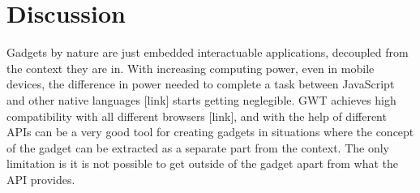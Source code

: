 \newpage
\section{Discussion}

Gadgets by nature are just embedded interactuable applications, decoupled from the context they are in. With increasing computing power, even in mobile devices, the difference in power needed to complete a task between JavaScript and other native languages [link] starts getting neglegible. GWT achieves high compatibility with all different browsers [link], and with the help of different APIs can be a very good tool for creating gadgets in situations where the concept of the gadget can be extracted as a separate part from the context. The only limitation is it is not possible to get outside of the gadget apart from what the API provides.\\\\
